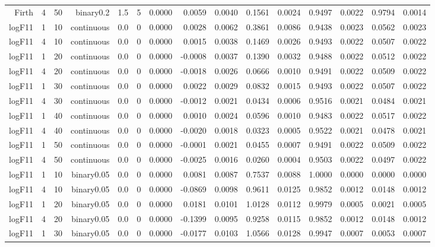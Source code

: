 \begin{longtable}{rrrrrrrrrrrrrrr}
  Firth & 4 & 50 & binary0.2 & 1.5 & 5 & 0.0000 & 0.0059 & 0.0040 & 0.1561 & 0.0024 & 0.9497 & 0.0022 & 0.9794 & 0.0014 \\ 
  logF11 & 1 & 10 & continuous & 0.0 & 0 & 0.0000 & 0.0028 & 0.0062 & 0.3861 & 0.0086 & 0.9438 & 0.0023 & 0.0562 & 0.0023 \\ 
  logF11 & 4 & 10 & continuous & 0.0 & 0 & 0.0000 & 0.0015 & 0.0038 & 0.1469 & 0.0026 & 0.9493 & 0.0022 & 0.0507 & 0.0022 \\ 
  logF11 & 1 & 20 & continuous & 0.0 & 0 & 0.0000 & -0.0008 & 0.0037 & 0.1390 & 0.0032 & 0.9488 & 0.0022 & 0.0512 & 0.0022 \\ 
  logF11 & 4 & 20 & continuous & 0.0 & 0 & 0.0000 & -0.0018 & 0.0026 & 0.0666 & 0.0010 & 0.9491 & 0.0022 & 0.0509 & 0.0022 \\ 
  logF11 & 1 & 30 & continuous & 0.0 & 0 & 0.0000 & 0.0022 & 0.0029 & 0.0832 & 0.0015 & 0.9493 & 0.0022 & 0.0507 & 0.0022 \\ 
  logF11 & 4 & 30 & continuous & 0.0 & 0 & 0.0000 & -0.0012 & 0.0021 & 0.0434 & 0.0006 & 0.9516 & 0.0021 & 0.0484 & 0.0021 \\ 
  logF11 & 1 & 40 & continuous & 0.0 & 0 & 0.0000 & 0.0010 & 0.0024 & 0.0596 & 0.0010 & 0.9483 & 0.0022 & 0.0517 & 0.0022 \\ 
  logF11 & 4 & 40 & continuous & 0.0 & 0 & 0.0000 & -0.0020 & 0.0018 & 0.0323 & 0.0005 & 0.9522 & 0.0021 & 0.0478 & 0.0021 \\ 
  logF11 & 1 & 50 & continuous & 0.0 & 0 & 0.0000 & -0.0001 & 0.0021 & 0.0455 & 0.0007 & 0.9491 & 0.0022 & 0.0509 & 0.0022 \\ 
  logF11 & 4 & 50 & continuous & 0.0 & 0 & 0.0000 & -0.0025 & 0.0016 & 0.0260 & 0.0004 & 0.9503 & 0.0022 & 0.0497 & 0.0022 \\ 
  logF11 & 1 & 10 & binary0.05 & 0.0 & 0 & 0.0000 & 0.0081 & 0.0087 & 0.7537 & 0.0088 & 1.0000 & 0.0000 & 0.0000 & 0.0000 \\ 
  logF11 & 4 & 10 & binary0.05 & 0.0 & 0 & 0.0000 & -0.0869 & 0.0098 & 0.9611 & 0.0125 & 0.9852 & 0.0012 & 0.0148 & 0.0012 \\ 
  logF11 & 1 & 20 & binary0.05 & 0.0 & 0 & 0.0000 & 0.0181 & 0.0101 & 1.0128 & 0.0112 & 0.9979 & 0.0005 & 0.0021 & 0.0005 \\ 
  logF11 & 4 & 20 & binary0.05 & 0.0 & 0 & 0.0000 & -0.1399 & 0.0095 & 0.9258 & 0.0115 & 0.9852 & 0.0012 & 0.0148 & 0.0012 \\ 
  logF11 & 1 & 30 & binary0.05 & 0.0 & 0 & 0.0000 & -0.0177 & 0.0103 & 1.0566 & 0.0128 & 0.9947 & 0.0007 & 0.0053 & 0.0007 \\ 

\end{longtable}
